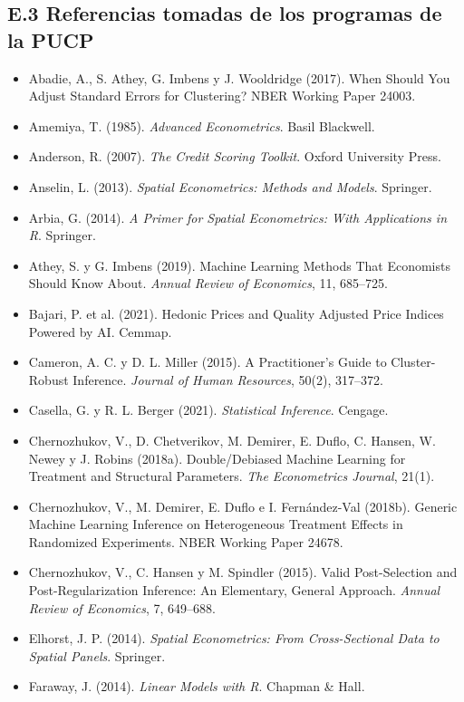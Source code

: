 \documentclass[11pt,a4paper]{article}
\begin{document}
\subsection*{E.3 Referencias tomadas de los programas de la PUCP}
{\small
\begin{itemize}[leftmargin=1.4em,itemsep=1pt,label={}]
\item Abadie, A., S. Athey, G. Imbens y J. Wooldridge (2017). When Should You Adjust Standard Errors for Clustering? NBER Working Paper 24003.
\item Amemiya, T. (1985). \emph{Advanced Econometrics}. Basil Blackwell.
\item Anderson, R. (2007). \emph{The Credit Scoring Toolkit}. Oxford University Press.
\item Anselin, L. (2013). \emph{Spatial Econometrics: Methods and Models}. Springer.
\item Arbia, G. (2014). \emph{A Primer for Spatial Econometrics: With Applications in R}. Springer.
\item Athey, S. y G. Imbens (2019). Machine Learning Methods That Economists Should Know About. \emph{Annual Review of Economics}, 11, 685--725.
\item Bajari, P. et al. (2021). Hedonic Prices and Quality Adjusted Price Indices Powered by AI. Cemmap.
\item Cameron, A. C. y D. L. Miller (2015). A Practitioner's Guide to Cluster-Robust Inference. \emph{Journal of Human Resources}, 50(2), 317--372.
\item Casella, G. y R. L. Berger (2021). \emph{Statistical Inference}. Cengage.
\item Chernozhukov, V., D. Chetverikov, M. Demirer, E. Duflo, C. Hansen, W. Newey y J. Robins (2018a). Double/Debiased Machine Learning for Treatment and Structural Parameters. \emph{The Econometrics Journal}, 21(1).
\item Chernozhukov, V., M. Demirer, E. Duflo e I. Fernández-Val (2018b). Generic Machine Learning Inference on Heterogeneous Treatment Effects in Randomized Experiments. NBER Working Paper 24678.
\item Chernozhukov, V., C. Hansen y M. Spindler (2015). Valid Post-Selection and Post-Regularization Inference: An Elementary, General Approach. \emph{Annual Review of Economics}, 7, 649--688.
\item Elhorst, J. P. (2014). \emph{Spatial Econometrics: From Cross-Sectional Data to Spatial Panels}. Springer.
\item Faraway, J. (2014). \emph{Linear Models with R}. Chapman \& Hall.

\end{itemize}}
\end{document}

